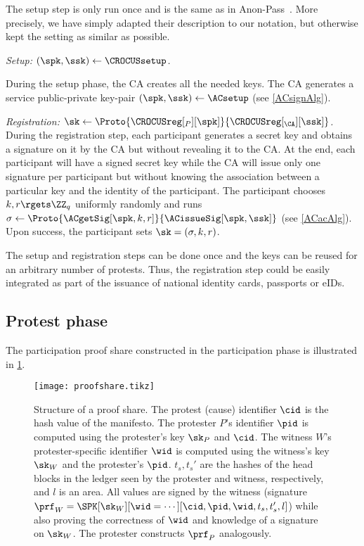 The setup step is only run once and is the same as in Anon-Pass~\cite{AnonPass}.
More precisely, we have simply adapted their description to our notation, but otherwise kept the setting as similar as possible.


\emph{Setup: \((\spk, \ssk)\gets \CROCUSsetup\).}


During the setup phase, the \ac{CA} creates all the needed keys.
The \ac{CA} generates a service public-private key-pair \((\spk, \ssk)\gets 
  \ACsetup\) (see \cref{ACsignAlg}).

\emph{Registration: \(\sk\gets 
    \Proto{\CROCUSreg[_P][\spk]}{\CROCUSreg[_{\CA}][\ssk]}\).}
During the registration step, each participant generates a secret key and 
obtains a signature on it by the \ac{CA} but without revealing it to the 
\ac{CA}.
At the end, each participant will have a signed secret key while the \ac{CA} 
will issue only one signature per participant but without knowing the 
association between a particular key and the identity of the participant.
The participant chooses \(k, r\rgets \ZZ_q\) uniformly randomly and runs 
\(\sigma \gets \Proto{\ACgetSig[\spk, k, r]}{\ACissueSig[\spk, \ssk]}\) (see 
\cref{ACacAlg}).
Upon success, the participant sets \(\sk = (\sigma, k, r)\).

The setup and registration steps can be done once and the keys can be reused 
for an arbitrary number of protests.
Thus, the registration step could be easily integrated as part of the issuance 
of national identity cards, passports or \acp{eID}.

\subsection{Protest phase}%
\label{ProtocolDuring}



The participation proof share constructed in the
participation phase is illustrated in \cref{fig:ProofFig}.

\begin{figure}
  \centering
  \small
  \texttt{[image: proofshare.tikz]}
  \caption{%
    Structure of a proof share.
    The protest (cause) identifier \(\cid\) is the hash value of the manifesto.
    The protester \(P\)'s identifier \(\pid\) is computed using the protester's key \(\sk_P\) and \(\cid\).
    The witness \(W\)'s protester-specific identifier \(\wid\) is computed using the
    witness's key \(\sk_W\) and the protester's \(\pid\).
    \(t_s, t_s'\) are the hashes of the head blocks in the ledger seen by the 
    protester and witness, respectively, and \(l\) is an area.
    All values are signed by the witness (signature \(\prf_W = \SPK[\sk_W][\wid 
      = \dotsb][\cid, \pid, \wid, t_s, t_s', l]\)) while also proving the 
    correctness of \(\wid\) and knowledge of a signature on \(\sk_W\).
    The protester constructs \(\prf_P\) analogously.
  }%
  \label{fig:ProofFig}
\end{figure}%


